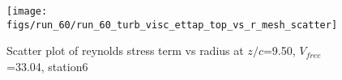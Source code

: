 \begin{figure}[H]
\centering
\texttt{[image: figs/run\_60/run\_60\_turb\_visc\_ettap\_top\_vs\_r\_mesh\_scatter]}
\caption{Scatter plot of reynolds stress term vs radius at $z/c$=9.50, $V_{free}$=33.04, station6}
\label{fig:run_60_turb_visc_ettap_top_vs_r_mesh_scatter}
\end{figure}


